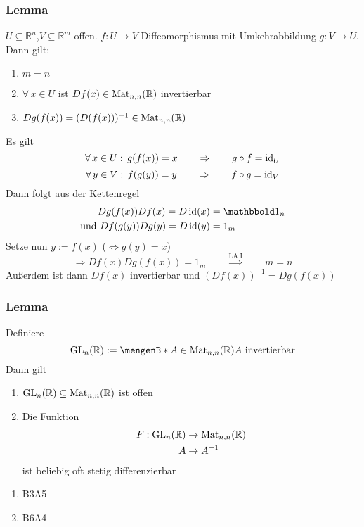 \subsubsection{Lemma} %
\label{ssub:lemma}
$ U \subseteq \mathbb{R}^n$,$V \subseteq \mathbb{R}^m$ offen. $f: U \to V$ Diffeomorphismus mit Umkehrabbildung $g: V \to U$. \\
Dann gilt:
\begin{enumerate}
	\item $m=n$
	\item $\forall\, x \in U$ ist $Df(x) \in \operatorname{Mat}_{n,n}(\mathbb{R})$ invertierbar
	\item $Dg(f(x))=(D(f(x)))^{-1} \in \operatorname{Mat}_{n,n}(\mathbb{R})$
\end{enumerate}
 Es gilt
\[
	\forall\, x \in U: \,g(f(x))=x \qquad \Rightarrow \qquad g \circ f = \operatorname{id}_U
\]
\[
	\forall\, y \in V: \,f(g(y))=y \qquad \Rightarrow \qquad f \circ g = \operatorname{id}_V
\]
Dann folgt aus der Kettenregel
\begin{align*}
	Dg(f(x))Df(x)=D \id(x) &= \ind_n \\
	\text{und }Df(g(y))Dg(y)= D \id(y) &= 1_m
\end{align*}
Setze nun $y:=f(x)$ ($\Leftrightarrow g(y)=x$) \\
\[
\Rightarrow Df(x)Dg(f(x))= 1_m \qquad \stackrel{\text{LA.I}}{\Rightarrow} \qquad m=n
\]
Außerdem ist dann $Df(x)$ invertierbar und $(Df(x))^{-1}=Dg(f(x))$
\bewende
\subsubsection{Lemma} %
\label{ssub:lemma}
Definiere
\[
	\GL_n(\mathbb{R}):= \set[A \in \Mat_{n,n}(\mathbb{R})]{A \text{ invertierbar}}
\]
Dann gilt
\begin{enumerate}
	\item $\operatorname{GL}_n(\mathbb{R}) \subseteq \operatorname{Mat}_{n,n}(\mathbb{R})$ ist offen
	\item Die Funktion \begin{align*}
		F: \operatorname{GL}_n(\mathbb{R}) &\to \operatorname{Mat}_{n,n}(\mathbb{R}) \\
		A &\to A^{-1} 
	\end{align*}
ist beliebig oft stetig differenzierbar
\end{enumerate}
 \begin{enumerate}
	\item B3A5
	\item B6A4
\end{enumerate}
